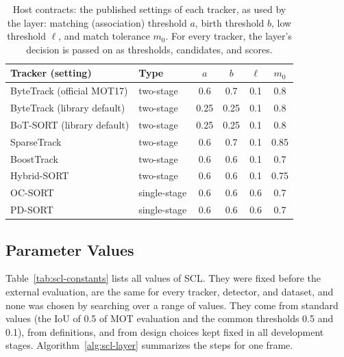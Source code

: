 \begin{table}[tbp]
\centering
\caption{Host contracts: the published settings of each tracker, as used by the layer: matching (association) threshold $a$, birth threshold $b$, low threshold $\ell$, and match tolerance $m_0$. For every tracker, the layer's decision is passed on as thresholds, candidates, and scores.}
\label{tab:scl-contracts}
\begin{tabular}{>{\raggedright\arraybackslash}p{5.0cm}lcccc}
\toprule
Tracker (setting) & Type & $a$ & $b$ & $\ell$ & $m_0$\\
\midrule
ByteTrack (official MOT17) & two-stage & 0.6 & 0.7 & 0.1 & 0.8\\
ByteTrack (library default) & two-stage & 0.25 & 0.25 & 0.1 & 0.8\\
BoT-SORT (library default) & two-stage & 0.25 & 0.25 & 0.1 & 0.8\\
SparseTrack & two-stage & 0.6 & 0.7 & 0.1 & 0.85\\
BoostTrack & two-stage & 0.6 & 0.6 & 0.1 & 0.7\\
Hybrid-SORT & two-stage & 0.6 & 0.6 & 0.1 & 0.75\\
OC-SORT & single-stage & 0.6 & 0.6 & 0.6 & 0.7\\
PD-SORT & single-stage & 0.6 & 0.6 & 0.6 & 0.7\\
\bottomrule
\end{tabular}
\end{table}

\subsection{Parameter Values}\label{sec:scl-constants}
Table~\ref{tab:scl-constants} lists all values of SCL. They were fixed before the external evaluation, are the same for every tracker, detector, and dataset, and none was chosen by searching over a range of values. They come from standard values (the IoU of 0.5 of MOT evaluation and the common thresholds 0.5 and 0.1), from definitions, and from design choices kept fixed in all development stages. Algorithm~\ref{alg:scl-layer} summarizes the steps for one frame.

